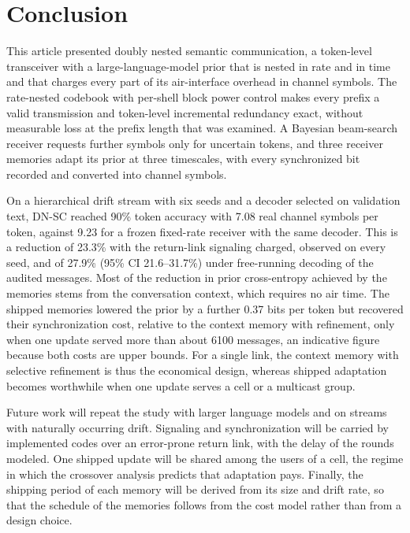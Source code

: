 \section{Conclusion}
\label{sec:conclusion}

This article presented doubly nested semantic communication, a token-level transceiver with a large-language-model prior that is nested in rate and in time and that charges every part of its air-interface overhead in channel symbols. The rate-nested codebook with per-shell block power control makes every prefix a valid transmission and token-level incremental redundancy exact, without measurable loss at the prefix length that was examined. A Bayesian beam-search receiver requests further symbols only for uncertain tokens, and three receiver memories adapt its prior at three timescales, with every synchronized bit recorded and converted into channel symbols.

On a hierarchical drift stream with six seeds and a decoder selected on validation text, DN-SC reached 90\% token accuracy with 7.08 real channel symbols per token, against 9.23 for a frozen fixed-rate receiver with the same decoder. This is a reduction of 23.3\% with the return-link signaling charged, observed on every seed, and of 27.9\% (95\% CI 21.6--31.7\%) under free-running decoding of the audited messages. Most of the reduction in prior cross-entropy achieved by the memories stems from the conversation context, which requires no air time. The shipped memories lowered the prior by a further 0.37 bits per token but recovered their synchronization cost, relative to the context memory with refinement, only when one update served more than about 6100 messages, an indicative figure because both costs are upper bounds. For a single link, the context memory with selective refinement is thus the economical design, whereas shipped adaptation becomes worthwhile when one update serves a cell or a multicast group.

Future work will repeat the study with larger language models and on streams with naturally occurring drift. Signaling and synchronization will be carried by implemented codes over an error-prone return link, with the delay of the rounds modeled. One shipped update will be shared among the users of a cell, the regime in which the crossover analysis predicts that adaptation pays. Finally, the shipping period of each memory will be derived from its size and drift rate, so that the schedule of the memories follows from the cost model rather than from a design choice.
